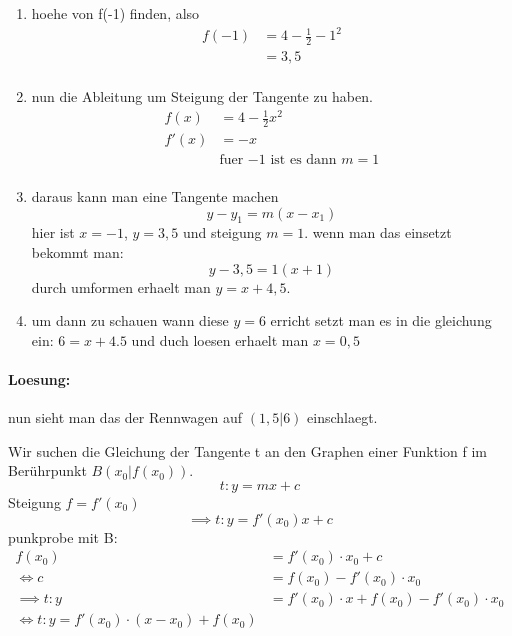 \documentclass{book}
\begin{document}
\begin{multicols}{2}

  \begin{enumerate}
    \item hoehe von f(-1) finden, also 
      \begin{align*}
        f(-1)&=4-\frac{1}{2}-1^2\\
        &=3,5\\
      \end{align*}
    \item nun die Ableitung um Steigung der Tangente zu haben.
      \begin{align*}
        f(x)&=4-\frac{1}{2}x^2\\
        f'(x)&=-x\\
             &\text{fuer $-1$ ist es dann $m=1$}\\
      \end{align*}
    \item daraus kann man eine Tangente machen
      \[y-y_1=m(x-x_1)\]
      hier ist $x=-1$, $y=3,5$ und steigung $m=1$. wenn man das einsetzt bekommt man:
      \[y-3,5=1(x+1)\]
      durch umformen erhaelt man $y=x+4,5$.
    \item um dann zu schauen wann diese $y=6$ erricht setzt man es in die
      gleichung ein: $6=x+4.5$ und duch loesen erhaelt man $x=0,5$
  \end{enumerate}
  \paragraph{Loesung:} nun sieht man das der Rennwagen auf $(1,5|6)$ einschlaegt.
\end{multicols}



\begin{tcolorbox}[colback=blue!10!white,colframe=blue!50!black,title=Tangentengleichung]
  Wir suchen die Gleichung der Tangente t an den Graphen einer Funktion f im Ber\"uhrpunkt $B(x_0|f(x_0))$.
  \[t:y=mx+c\]
  Steigung $f=f'(x_0)$
  \[\implies t:y=f'(x_0)x+c\]
  punkprobe mit B:
  \begin{align*}
    f(x_0)&=f'(x_0)\cdot x_0+c\\
    \Leftrightarrow c&=f(x_0)-f'(x_0)\cdot x_0\\
    \implies t:y&=f'(x_0)\cdot x+f(x_0)-f'(x_0)\cdot x_0\\
    \Leftrightarrow t: y=f'(x_0)\cdot (x-x_0)+f(x_0)
  \end{align*}
\end{tcolorbox}
\end{document}

